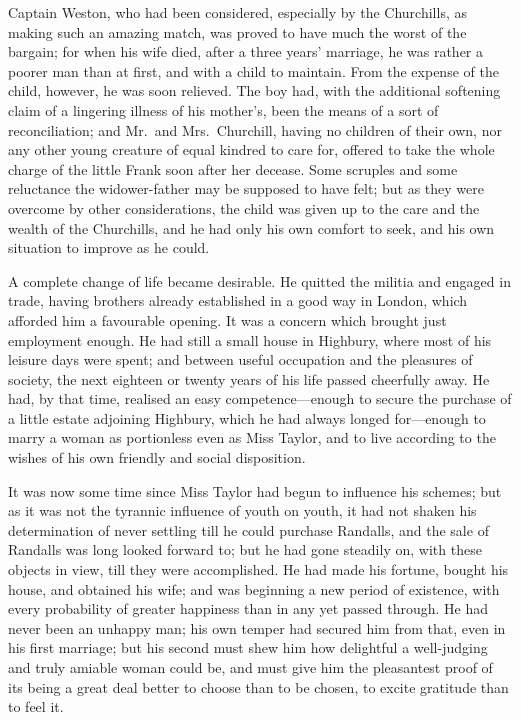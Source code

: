Captain Weston, who had been considered, especially by the Churchills,
as making such an amazing match, was proved to have much the worst
of the bargain; for when his wife died, after a three years' marriage,
he was rather a poorer man than at first, and with a child to maintain.
From the expense of the child, however, he was soon relieved.
The boy had, with the additional softening claim of a lingering
illness of his mother's, been the means of a sort of reconciliation;
and Mr.\ and Mrs.\ Churchill, having no children of their own,
nor any other young creature of equal kindred to care for, offered to
take the whole charge of the little Frank soon after her decease.
Some scruples and some reluctance the widower-father may be supposed
to have felt; but as they were overcome by other considerations,
the child was given up to the care and the wealth of the Churchills,
and he had only his own comfort to seek, and his own situation to
improve as he could.

A complete change of life became desirable.  He quitted the militia
and engaged in trade, having brothers already established in a
good way in London, which afforded him a favourable opening.
It was a concern which brought just employment enough.  He had still
a small house in Highbury, where most of his leisure days were spent;
and between useful occupation and the pleasures of society,
the next eighteen or twenty years of his life passed cheerfully away.
He had, by that time, realised an easy competence---enough to secure
the purchase of a little estate adjoining Highbury, which he had
always longed for---enough to marry a woman as portionless even
as Miss Taylor, and to live according to the wishes of his own
friendly and social disposition.

It was now some time since Miss Taylor had begun to influence
his schemes; but as it was not the tyrannic influence of youth
on youth, it had not shaken his determination of never settling
till he could purchase Randalls, and the sale of Randalls was long
looked forward to; but he had gone steadily on, with these objects
in view, till they were accomplished.  He had made his fortune,
bought his house, and obtained his wife; and was beginning a new
period of existence, with every probability of greater happiness
than in any yet passed through.  He had never been an unhappy man;
his own temper had secured him from that, even in his first marriage;
but his second must shew him how delightful a well-judging and truly
amiable woman could be, and must give him the pleasantest proof
of its being a great deal better to choose than to be chosen,
to excite gratitude than to feel it.

